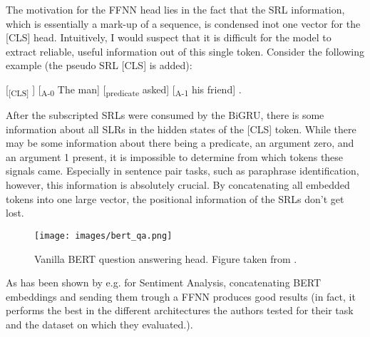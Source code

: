 
The motivation for the FFNN head lies in the fact that the SRL information, which is essentially
a mark-up of a sequence, is condensed inot one vector for the [CLS] head. Intuitively, I would
suspect that it is difficult for the model to extract reliable, useful information out of this
single token. Consider the following example (the pseudo SRL [CLS] is added):


[\textsubscript{[CLS]} ] [\textsubscript{A-0} The man] [\textsubscript{predicate} asked] [\textsubscript{A-1} his friend] .

After the subscripted SRLs were consumed by the BiGRU, there is some information about all SLRs
in the hidden states of the [CLS] token. While there may be some information about there being a
predicate, an argument zero, and an argument 1 present, it is impossible to determine from which
tokens these signals came. Especially in sentence pair tasks, such as paraphrase identification,
however, this information is absolutely crucial. By concatenating all embedded tokens into one
large vector, the positional information of the SRLs don't get lost.

\begin{wrapfigure}[21]{r}{0.45\linewidth}
  \begin{center}
    \texttt{[image: images/bert\_qa.png]}
  \end{center}
  \caption[BERT Q\&A]{Vanilla BERT question answering head. Figure taken from \citep{devlin2018bert}.}
  \label{fig:bert-qa}
\end{wrapfigure}

As has been shown by e.g. \cite{myagmar2019transferable} for Sentiment Analysis, concatenating
BERT embeddings and sending them trough a FFNN produces good results (in fact, it performs the
best in the different architectures the authors tested for their task and the dataset on which
they evaluated.).


